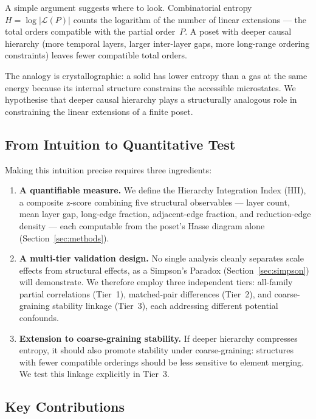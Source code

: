 \documentclass[entropy,article,submit,pdftex,moreauthors]{Definitions/mdpi}
\begin{document}
A simple argument suggests where to look. Combinatorial entropy $H = \log |\mathcal{L}(P)|$ counts the logarithm of the number of linear extensions --- the total orders compatible with the partial order~$P$. A poset with deeper causal hierarchy (more temporal layers, larger inter-layer gaps, more long-range ordering constraints) leaves fewer compatible total orders.

The analogy is crystallographic: a solid has lower entropy than a gas at the same energy because its internal structure constrains the accessible microstates. We hypothesise that deeper causal hierarchy plays a structurally analogous role in constraining the linear extensions of a finite poset.

\subsection{From Intuition to Quantitative Test}

Making this intuition precise requires three ingredients:

\begin{enumerate}[nosep]
    \item \textbf{A quantifiable measure.} We define the Hierarchy Integration Index (HII), a composite z-score combining five structural observables --- layer count, mean layer gap, long-edge fraction, adjacent-edge fraction, and reduction-edge density --- each computable from the poset's Hasse diagram alone (Section~\ref{sec:methods}).
    \item \textbf{A multi-tier validation design.} No single analysis cleanly separates scale effects from structural effects, as a Simpson's Paradox (Section~\ref{sec:simpson}) will demonstrate. We therefore employ three independent tiers: all-family partial correlations (Tier~1), matched-pair differences (Tier~2), and coarse-graining stability linkage (Tier~3), each addressing different potential confounds.
    \item \textbf{Extension to coarse-graining stability.} If deeper hierarchy compresses entropy, it should also promote stability under coarse-graining: structures with fewer compatible orderings should be less sensitive to element merging. We test this linkage explicitly in Tier~3.
\end{enumerate}

\subsection{Key Contributions}
\end{document}
